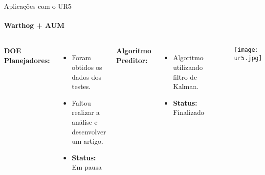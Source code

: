 \begin{frame}[t]{Aplicações com o UR5} 
    \framesubtitle{Warthog + AUM}
        \begin{columns}[t]
            \vspace*{-0.3cm}

            \textbf{DOE Planejadores:}
            \begin{itemize}
                \item Foram obtidos os dados dos testes.
                \item Faltou realizar a análise e desenvolver um artigo.
                \item \textbf{Status:} Em pausa
            \end{itemize}
            \vspace*{0.3cm}

            \textbf{Algoritmo Preditor:}
            \begin{itemize}
                \item Algoritmo utilizando filtro de Kalman.
                \item \textbf{Status:} Finalizado
            \end{itemize}
            \begin{center}
                \begin{figure}
                    \texttt{[image: ur5.jpg]}
                \end{figure}
            \end{center}
        \end{columns}
\end{frame}
